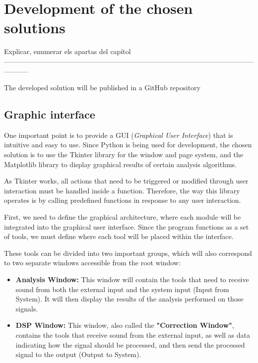 \chapter{Development of the chosen solutions}

Explicar, enumerar els apartas del capítol -----------------------------------------------------------------------------------------------------------------------

The developed solution will be published in a GitHub repository \cite{git}

\section{Graphic interface}

One important point is to provide a GUI (\textit{Graphical User Interface}) that is intuitive and easy to use. Since Python is being used for development, the chosen solution is to use the Tkinter\cite{Tkinter} library for the window and page system, and the Matplotlib\cite{Matplotlib} library to display graphical results of certain analysis algorithms.

As Tkinter works, all actions that need to be triggered or modified through user interaction must be handled inside a function. Therefore, the way this library operates is by calling predefined functions in response to any user interaction.

First, we need to define the graphical architecture, where each module will be integrated into the graphical user interface. Since the program functions as a set of tools, we must define where each tool will be placed within the interface.

These tools can be divided into two important groups, which will also correspond to two separate windows accessible from the root window:

\begin{itemize}
	\item \textbf{Analysis Window:} This window will contain the tools that need to receive sound from both the external input and the system input (Input from System). It will then display the results of the analysis performed on those signals.
	\item \textbf{DSP Window:} This window, also called the \textbf{"Correction Window"}, contains the tools that receive sound from the external input, as well as data indicating how the signal should be processed, and then send the processed signal to the output (Output to System).
\end{itemize}


